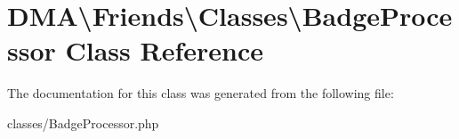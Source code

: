 \hypertarget{classDMA_1_1Friends_1_1Classes_1_1BadgeProcessor}{\section{D\-M\-A\textbackslash{}Friends\textbackslash{}Classes\textbackslash{}Badge\-Processor Class Reference}
\label{classDMA_1_1Friends_1_1Classes_1_1BadgeProcessor}
}


The documentation for this class was generated from the following file\-:\begin{DoxyCompactItemize}
\item 
classes/Badge\-Processor.\-php\end{DoxyCompactItemize}
